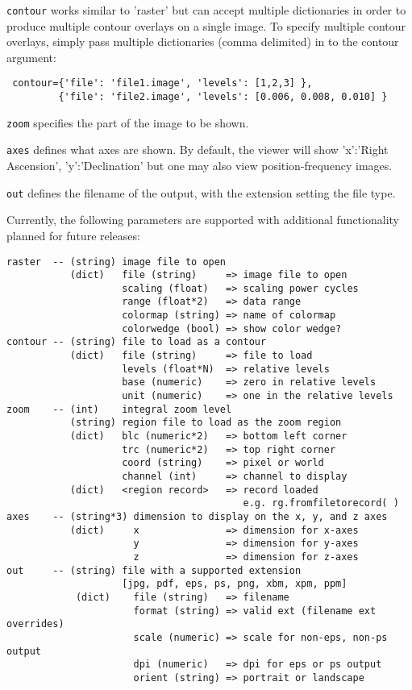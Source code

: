 {\tt contour} works similar to 'raster' but can accept multiple dictionaries in order to produce
multiple contour overlays on a single image. To specify multiple contour overlays, simply 
pass multiple dictionaries (comma delimited) in to the contour argument:

\small
\begin{verbatim}
 contour={'file': 'file1.image', 'levels': [1,2,3] },
         {'file': 'file2.image', 'levels': [0.006, 0.008, 0.010] }
\end{verbatim}
\normalsize

{\tt zoom} specifies the part of the image to be shown.

{\tt axes} defines what axes are shown. By default, the viewer 
will show 'x':'Right Ascension', 'y':'Declination' but one may also
view position-frequency images. 

{\tt out} defines the filename of the output, with the extension setting the file type. 

Currently, the following parameters are supported with additional functionality
planned for future releases:

\small
\begin{verbatim}
raster  -- (string) image file to open
           (dict)   file (string)     => image file to open
                    scaling (float)   => scaling power cycles
                    range (float*2)   => data range
                    colormap (string) => name of colormap
                    colorwedge (bool) => show color wedge?
contour -- (string) file to load as a contour
           (dict)   file (string)     => file to load
                    levels (float*N)  => relative levels
                    base (numeric)    => zero in relative levels
                    unit (numeric)    => one in the relative levels
zoom    -- (int)    integral zoom level
           (string) region file to load as the zoom region
           (dict)   blc (numeric*2)   => bottom left corner
                    trc (numeric*2)   => top right corner
                    coord (string)    => pixel or world
                    channel (int)     => channel to display
           (dict)   <region record>   => record loaded
                                         e.g. rg.fromfiletorecord( )
axes    -- (string*3) dimension to display on the x, y, and z axes
           (dict)     x               => dimension for x-axes
                      y               => dimension for y-axes
                      z               => dimension for z-axes
out     -- (string) file with a supported extension
                    [jpg, pdf, eps, ps, png, xbm, xpm, ppm]
            (dict)    file (string)   => filename
                      format (string) => valid ext (filename ext overrides)
                      scale (numeric) => scale for non-eps, non-ps output
                      dpi (numeric)   => dpi for eps or ps output
                      orient (string) => portrait or landscape
\end{verbatim}
\normalsize

